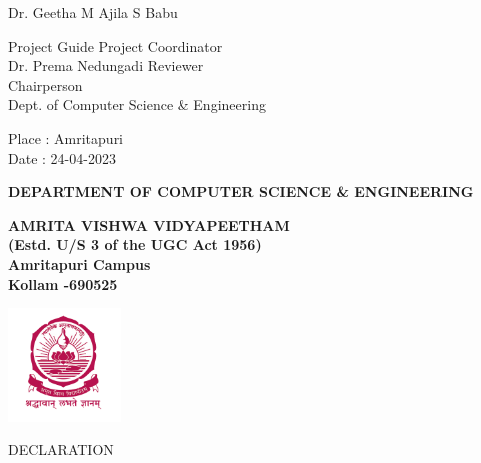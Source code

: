 \documentclass[oneside,12pt]{Classes/CUEDthesisPSnPDF}
\begin{document}



\vspace{20pt}

\begin{flushleft}
	\vspace{5pt}
	Dr. Geetha M \hspace{242pt} Ajila S Babu\\

	\vspace{3pt}

	Project Guide \hspace{230pt} Project Coordinator\\[10ex]



	Dr. Prema Nedungadi  \hspace{185pt} Reviewer\\  Chairperson\\ Dept. of Computer Science \& Engineering \\[8ex]




\end{flushleft}

\begin{flushleft}

	\vspace{5pt}

	Place	:	Amritapuri \\
	Date	: 24-04-2023

\end{flushleft}



\pagebreak


\begin{center}

	{\normalsize {\bfseries{DEPARTMENT OF COMPUTER SCIENCE \& ENGINEERING\\[1ex]}}}


	{\normalsize {\bfseries{AMRITA VISHWA VIDYAPEETHAM\\ (Estd. U/S 3 of the UGC Act 1956)\\ [1ex]Amritapuri  Campus \\[1ex] Kollam -690525\\[1ex]}}}

	\includegraphics[width=30mm]{UNIVEMBLEM.png}


	\rmfamily\bfseries\upshape\Large

	DECLARATION \\[2ex]


\end{center}
\end{document}
